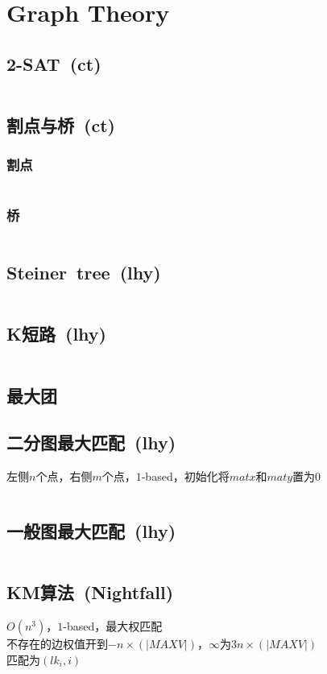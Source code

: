 \chapter{Graph Theory}
\section{2-SAT\ \small(ct)}
	\inputminted{cpp}{GraphTheory/2_sat.cpp}
\section{割点与桥\ \small(ct)}
	\subsection*{割点}
		\inputminted{cpp}{GraphTheory/cut_point.cpp}
	\subsection*{桥}
		\inputminted{cpp}{GraphTheory/bridge.cpp}
\section{Steiner\ tree\ \small(lhy)}
	\inputminted{cpp}{GraphTheory/steiner_tree.cpp}
\section{K短路\ \small(lhy)}
	\inputminted{cpp}{GraphTheory/kth_minimum_path.cpp}
\section{最大团}
\section{二分图最大匹配\ \small(lhy)}
	左侧$ n $个点，右侧$ m $个点，$ 1 $-based，初始化将$ matx $和$ maty $置为$ 0 $
	\inputminted{cpp}{GraphTheory/hopcroft_karp.cpp}
\section{一般图最大匹配\ \small(lhy)}
	\inputminted{cpp}{GraphTheory/blossom.cpp}
\section{KM算法\ \small(Nightfall)}
	$ O(n^3) $，$ 1 $-based，最大权匹配
	\\不存在的边权值开到$ -n \times (\left| MAXV \right|) $，$ \infty $为$ 3 n \times (\left| MAXV \right|) $
	\\匹配为$ (lk_i, i) $
	\inputminted{cpp}{GraphTheory/km.cpp}
